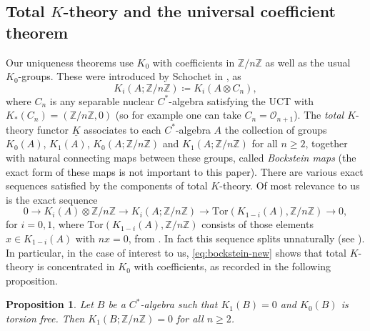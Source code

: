 \documentclass[reqno]{amsart}
\newtheorem{prop}[thm]{Proposition}
\theoremstyle{definition}
\theoremstyle{remark}
\numberwithin{equation}{section}
\theoremstyle{definition}
\newcommand{\calO}{\mathcal{O}}
\begin{document}
\subsection{Total $K$-theory and the universal coefficient theorem} 
\label{Intro:totalKtheory} 
Our uniqueness theorems use $K_0$ with coefficients in $\mathbb Z/n\mathbb Z$ as well as the usual $K_0$-groups.  These were introduced by Schochet in \cite{Schochet:PJM}, as
\begin{equation}
\label{Defn_total_K} 
K_i(A; \mathbb{Z} / n\mathbb{Z})\coloneqq K_{i}(A\otimes C_n),
\end{equation}
where $C_n$ is any separable nuclear $C^*$-algebra satisfying the UCT with $K_{*}(C_{n}) = (\mathbb{Z} / n\mathbb{Z}, 0)$ (so for example one can take $C_n=\mathcal O_{n+1}$). The \emph{total $K$}-theory functor $\underline{K}$ associates to each $C^*$-algebra $A$ the collection of groups $K_0(A)$, $K_1(A)$, $K_0(A;\mathbb Z/n\mathbb Z)$ and $K_1(A;\mathbb Z/n\mathbb Z)$ for all $n\geq 2$, together with natural connecting maps between these groups, called  \emph{Bockstein maps} (the exact form of these maps is not important to this paper). There are various exact sequences satisfied by the components of total $K$-theory. Of most relevance to us is the exact sequence
\begin{equation} 
\label{eq:bockstein-new}
0 \longrightarrow K_i(A)\otimes  \mathbb{Z} / n\mathbb{Z}\rightarrow  K_i(A; \mathbb{Z} / n\mathbb{Z}) \rightarrow \mathrm{Tor}(K_{1-i}(A), \mathbb{Z} / n\mathbb{Z}) \longrightarrow 0, 
\end{equation} 
for $i=0,1$, where $\mathrm{Tor}(K_{1-i}(A),\mathbb{Z} / n\mathbb{Z})$ consists of those elements $x\in K_{1-i}(A)$ with $nx=0$, from \cite[Proposition 1.8]{Schochet:PJM}. In fact this sequence splits unnaturally (see \cite[Proposition 2.4]{Schochet:PJM}). In particular, in the case of interest to us, \eqref{eq:bockstein-new} shows that total $K$-theory is concentrated in $K_0$ with coefficients, as recorded in the following proposition.
\begin{prop} 
\label{trivial_K1_coef} 
Let $B$ be a $C^*$-algebra such that $K_1(B)=0$ and $K_0(B)$ is torsion free.  Then $K_1(B;\mathbb Z/n\mathbb Z)=0$ for all $n\geq 2$.
\end{prop}
\end{document}
